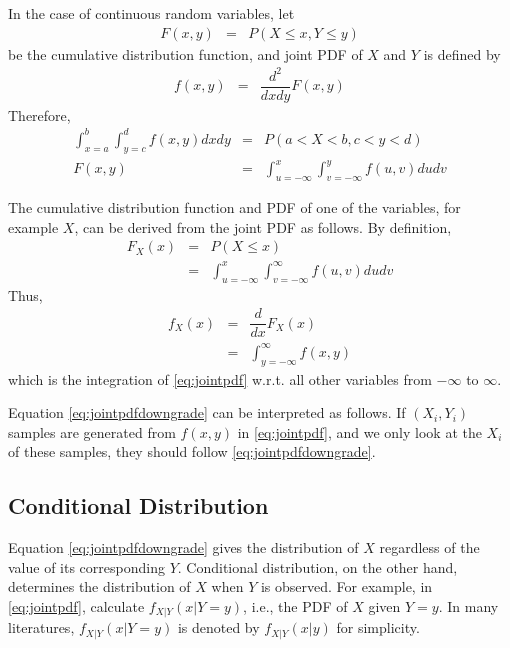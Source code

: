 In the case of continuous random variables, let
\begin{eqnarray}
  F(x, y) &=& P(X \leq x, Y \leq y) \nonumber
\end{eqnarray}
be the cumulative distribution function, and joint PDF of $X$ and $Y$ is defined by
\begin{eqnarray}
	f(x, y) &=& \dfrac{d^2}{dxdy}F(x, y) \nonumber
\end{eqnarray}
Therefore,
\begin{eqnarray}
  \int_{x=a}^{b}\int_{y=c}^{d} f(x, y) dxdy &=& P\left(a < X < b, c < y < d \right) \label{eq:jointpdf} \\
  F(x, y) &=& \int_{u=-\infty}^{x}\int_{v=-\infty}^{y}f(u, v)dudv \nonumber
\end{eqnarray}

The cumulative distribution function and PDF of one of the variables, for example $X$, can be derived from the joint PDF as follows. By definition, 
\begin{eqnarray}
	F_X(x) &=& P(X \leq x) \nonumber \\
	&=& \int_{u=-\infty}^{x}\int_{v=-\infty}^{\infty}f(u, v)dudv \nonumber
\end{eqnarray}
Thus,
\begin{eqnarray}
	f_X(x) &=& \dfrac{d}{dx}F_X(x) \nonumber \\
	&=& \int_{y=-\infty}^{\infty} f(x, y) \label{eq:jointpdfdowngrade}
\end{eqnarray}
which is the integration of \eqref{eq:jointpdf} w.r.t. all other variables from $-\infty$ to $\infty$. 

Equation \eqref{eq:jointpdfdowngrade} can be interpreted as follows. If $(X_i, Y_i)$ samples are generated from $f(x, y)$ in \eqref{eq:jointpdf}, and we only look at the $X_i$ of these samples, they should follow \eqref{eq:jointpdfdowngrade}.

\subsection{Conditional Distribution}

Equation \eqref{eq:jointpdfdowngrade} gives the distribution of $X$ regardless of the value of its corresponding $Y$. Conditional distribution, on the other hand, determines the distribution of $X$ when $Y$ is observed. For example, in \eqref{eq:jointpdf}, calculate $f_{X|Y}(x |Y=y)$, i.e., the PDF of $X$ given $Y=y$. In many literatures, $f_{X|Y}(x |Y=y)$ is denoted by $f_{X|Y}(x|y)$ for simplicity.

